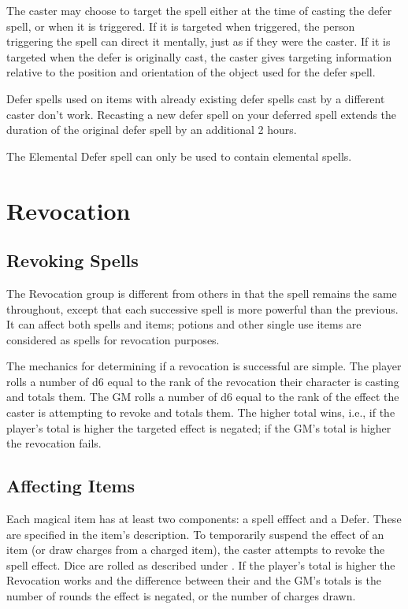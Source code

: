 The caster may choose to target the spell either at the time of casting the defer spell, or when it is triggered. If it is targeted when triggered, the person triggering the spell can direct it mentally, just as if they were the caster. If it is targeted when the defer is originally cast, the caster gives targeting information relative to the position and orientation of the object used for the defer spell.

Defer spells used on items with already existing defer spells cast by a different caster don’t work. Recasting a new defer spell on your deferred spell extends the duration of the original defer spell by an additional 2 hours.

The Elemental Defer spell can only be used to contain elemental spells.
\pagebreak
\section{Revocation}


\subsection{Revoking Spells}
\label{magic-elemental-core-revoking-spells}

The Revocation group is different from others in that the spell remains the same throughout, except that each successive spell is more powerful than the previous. It can affect both spells and items; potions and other single use items are considered as spells for revocation purposes.

The mechanics for determining if a revocation is successful are simple. The player rolls a number of d6 equal to the rank of the revocation their character is casting and totals them. The GM rolls a number of d6 equal to the rank of the effect the caster is attempting to revoke and totals them. The higher total wins, i.e., if the player's total is higher the targeted effect is negated; if the GM's total is higher the revocation fails.

\subsection{Affecting Items}

Each magical item has at least two components: a spell efffect and a Defer. These are specified in the item's description. To temporarily suspend the effect of an item (or draw charges from a charged item), the caster attempts to revoke the spell effect. Dice are rolled as described under . If the player’s total is higher the Revocation works and the difference between their and the GM's totals is the number of rounds the effect is negated, or the number of charges drawn.

